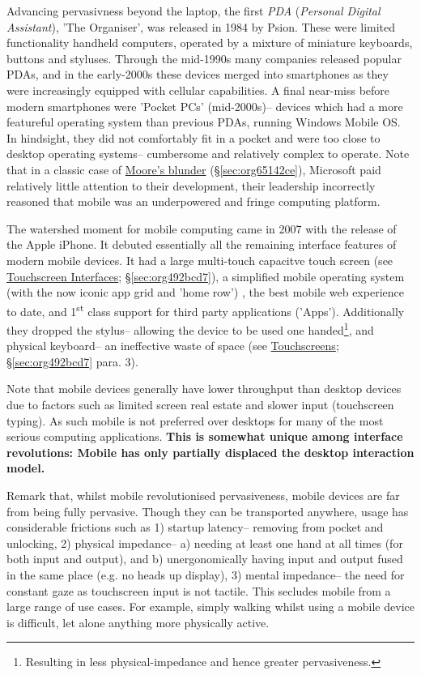 \documentclass[logo,bsc,singlespacing,parskip]{infthesis}
\begin{document}
Advancing pervasivness beyond the laptop, the first \emph{PDA} (\emph{Personal Digital Assistant}), 'The Organiser', was released in 1984 by Psion.
These were limited functionality handheld computers, operated by a mixture of miniature keyboards, buttons and styluses.
Through the mid-1990s many companies released popular PDAs, and in the early-2000s these devices merged into smartphones as they were increasingly equipped with cellular capabilities.
A final near-miss before modern smartphones were 'Pocket PCs' (mid-2000s)-- devices which had a more featureful operating system than previous PDAs, running Windows Mobile OS.
In hindsight, they did not comfortably fit in a pocket and were too close to desktop operating systems-- cumbersome and relatively complex to operate.
Note that in a classic case of \hyperref[sec:org65142ce]{Moore's blunder} (\S \ref{sec:org65142ce}), Microsoft paid relatively little attention to their development, their leadership incorrectly reasoned that mobile was an underpowered and fringe computing platform.

The watershed moment for mobile computing came in 2007 with the release of the Apple iPhone.
It debuted essentially all the remaining interface features of modern mobile devices.
It had a large multi-touch capacitve touch screen (see \hyperref[sec:org492bcd7]{Touchscreen Interfaces}; \S \ref{sec:org492bcd7}), a simplified mobile operating system (with the now iconic app grid and 'home row')  , the best mobile web experience to date, and 1\textsuperscript{st} class support for third party applications ('Apps').
Additionally they dropped the stylus-- allowing the device to be used one handed\footnote{Resulting in less physical-impedance and hence greater pervasiveness.}, and physical keyboard-- an ineffective waste of space (see \hyperref[sec:org492bcd7]{Touchscreens}; \S \ref{sec:org492bcd7} para. 3).

Note that mobile devices generally have lower throughput than desktop devices due to factors such as limited screen real estate and slower input (touchscreen typing).
As such mobile is not preferred over desktops for many of the most serious computing applications.
\textbf{This is somewhat unique among interface revolutions: Mobile has only partially displaced the desktop interaction model.}

Remark that, whilst mobile revolutionised pervasiveness, mobile devices are far from being fully pervasive.
Though they can be transported anywhere, usage has considerable frictions such as 1) startup latency-- removing from pocket and unlocking, 2) physical impedance-- a) needing at least one hand at all times (for both input and output), and b) unergonomically having input and output fused in the same place (e.g. no heads up display), 3) mental impedance-- the need for constant gaze as touchscreen input is not tactile.
This secludes mobile from a large range of use cases.
For example, simply walking whilst using a mobile device is difficult, let alone anything more physically active.
\end{document}
